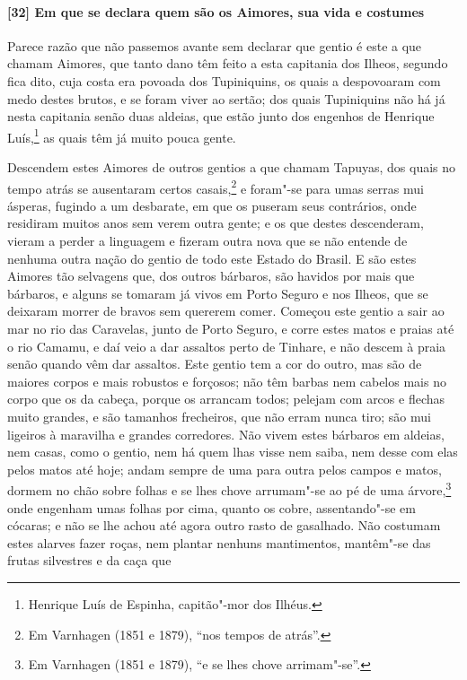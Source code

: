 \begin{linenumbers}
\paragraph{[32] Em que se declara quem são os Aimores, sua vida e costumes} \quad
Parece razão que não passemos avante sem declarar que gentio é este a que chamam Aimores,
que tanto dano têm feito a esta capitania dos Ilheos, segundo fica dito, cuja costa era
povoada dos Tupiniquins, os quais a despovoaram com medo destes brutos, e se foram viver
ao sertão; dos quais Tupiniquins não há já nesta capitania senão duas aldeias, que estão
junto dos engenhos de Henrique Luís,\footnote{ Henrique Luís de Espinha, capitão"-mor dos
Ilhéus.} as quais têm já muito pouca gente.

Descendem estes Aimores de outros gentios a que chamam Tapuyas, dos quais no tempo atrás
se ausentaram certos casais,\footnote{ Em Varnhagen (1851 e 1879), ``nos tempos de
atrás''.} e foram"-se para umas serras mui ásperas, fugindo a um desbarate, em que os
puseram seus contrários, onde residiram muitos anos sem verem outra gente; e os que destes
descenderam, vieram a perder a linguagem e fizeram outra nova que se não entende de
nenhuma outra nação do gentio de todo este Estado do Brasil. E são estes Aimores tão
selvagens que, dos outros bárbaros, são havidos por mais que bárbaros, e alguns se tomaram
já vivos em Porto Seguro e nos Ilheos, que se deixaram morrer de bravos sem quererem
comer. Começou este gentio a sair ao mar no rio das Caravelas, junto de Porto Seguro, e
corre estes matos e praias até o rio Camamu, e daí veio a dar assaltos perto de Tinhare, e
não descem à praia senão quando vêm dar assaltos. Este gentio tem a cor do outro, mas são
de maiores corpos e mais robustos e forçosos; não têm barbas nem cabelos mais no corpo que
os da cabeça, porque os arrancam todos; pelejam com arcos e flechas muito grandes, e são
tamanhos frecheiros, que não erram nunca tiro; são mui ligeiros à maravilha e grandes
corredores. Não vivem estes bárbaros em aldeias, nem casas, como o gentio, nem há quem
lhas visse nem saiba, nem desse com elas pelos matos até hoje; andam sempre de uma para
outra pelos campos e matos, dormem no chão sobre folhas e se lhes chove arrumam"-se ao pé
de uma árvore,\footnote{ Em Varnhagen (1851 e 1879), ``e se lhes chove arrimam"-se''.} onde
engenham umas folhas por cima, quanto os cobre, assentando"-se em cócaras; e não se lhe
achou até agora outro rasto de gasalhado. Não costumam estes alarves fazer roças, nem
plantar nenhuns mantimentos, mantêm"-se das frutas silvestres e da caça que

\end{linenumbers}
